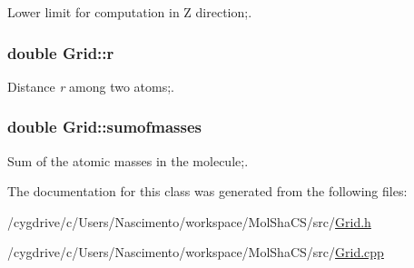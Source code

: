 Lower limit for computation in Z direction;. 

\hypertarget{classGrid_a50100ef8f1e23ba090567bd460e779cb}{
\subsubsection[{r}]{\setlength{\rightskip}{0pt plus 5cm}double {\bf Grid::r}}}
\label{classGrid_a50100ef8f1e23ba090567bd460e779cb}


Distance {\itshape r\/} among two atoms;. 

\hypertarget{classGrid_a2c6ed23a2ebb4e4bc967228bfbab6480}{
\subsubsection[{sumofmasses}]{\setlength{\rightskip}{0pt plus 5cm}double {\bf Grid::sumofmasses}}}
\label{classGrid_a2c6ed23a2ebb4e4bc967228bfbab6480}


Sum of the atomic masses in the molecule;. 



The documentation for this class was generated from the following files:\begin{DoxyCompactItemize}
\item 
/cygdrive/c/Users/Nascimento/workspace/MolShaCS/src/\hyperlink{Grid_8h}{Grid.h}\item 
/cygdrive/c/Users/Nascimento/workspace/MolShaCS/src/\hyperlink{Grid_8cpp}{Grid.cpp}\end{DoxyCompactItemize}
